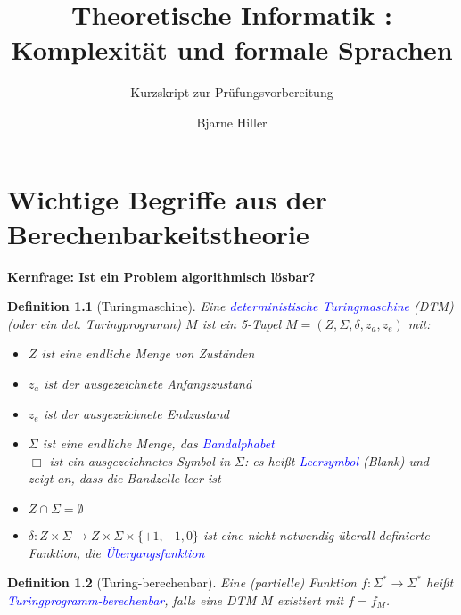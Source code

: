 \documentclass{scrreprt}
\begin{document}
\title{Theoretische Informatik {\uppercase\expandafter{}}:\\Komplexität und formale Sprachen}
\subtitle{Kurzskript zur Prüfungsvorbereitung}
\author{Bjarne Hiller}

\maketitle
\tableofcontents

\newtheorem{Definition}{Definition}[section]
\newtheorem{Satz}{Satz}[section]

\setcounter{chapter}{-1}
\chapter{Wichtige Begriffe aus der Berechenbarkeitstheorie}
\textbf{Kernfrage: Ist ein Problem algorithmisch lösbar?}

\begin{Definition}[Turingmaschine]
Eine \textcolor{blue}{deterministische Turingmaschine} (DTM) (oder ein det. Turingprogramm) $M$ ist ein 5-Tupel $M=(Z,\Sigma,\delta,z_a,z_e)$ mit:
\begin{itemize}
\item $Z$ ist eine endliche Menge von Zuständen
\item $z_a$ ist der ausgezeichnete Anfangszustand
\item $z_e$ ist der ausgezeichnete Endzustand
\item $\Sigma$ ist eine endliche Menge, das \textcolor{blue}{Bandalphabet}\\
$\Box$ ist ein ausgezeichnetes Symbol in $\Sigma$: es heißt \textcolor{blue}{Leersymbol} (Blank) und zeigt an, dass die Bandzelle leer ist
\item $Z \cap \Sigma = \emptyset$
\item $\delta : Z \times \Sigma \rightarrow Z \times \Sigma \times \{+1,-1,0\}$ ist eine nicht notwendig überall definierte Funktion, die \textcolor{blue}{Übergangsfunktion} 
\end{itemize}
\end{Definition}

\begin{Definition}[Turing-berechenbar]
Eine (partielle) Funktion $f: \Sigma^* \rightarrow \Sigma^*$ heißt \textcolor{blue}{Turingprogramm-berechenbar}, falls eine DTM $M$ existiert mit $f=f_M$.
\end{Definition}
\end{document}

